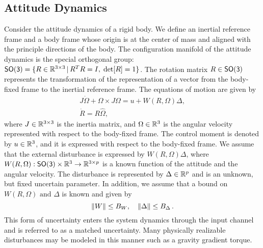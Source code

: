 \documentclass[letterpaper, 10 pt, conference]{ieeeconf}  %
\begin{document}
\subsection{Attitude Dynamics}\label{sec:att_dyn}
Consider the attitude dynamics of a rigid body. 
We define an inertial reference frame and a body frame whose origin is at the center of mass and aligned with the principle directions of the body. 
The configuration manifold of the attitude dynamics is the special orthogonal group: \(\mathsf{SO(3)} = \{R\in\mathbb{R}^{3\times 3}\,|\, R^TR=I,\;\mathrm{det}[R]=1\} \).
The rotation matrix $R\in\mathsf{SO(3)}$ represents the transformation of the representation of a vector from the body-fixed frame to the inertial reference frame. 
The equations of motion are given by
\begin{gather}
	J\dot\Omega + \Omega\times J\Omega = u+W(R,\Omega)\Delta ,\label{eqn:Wdot}\\
	\dot R = R\hat\Omega ,\label{eqn:Rdot}
\end{gather}
where $J\in\mathbb{R}^{3\times 3}$ is the inertia matrix, and $\Omega\in\mathbb{R}^{3}$ is the angular velocity represented with respect to the body-fixed frame. 
The control moment is denoted by $u\in\mathbb{R}^{3}$, and it is expressed with respect to the body-fixed frame. 
We assume that the external disturbance is expressed by $W(R,\Omega)\Delta$, where $W(R,\Omega):\mathsf{SO(3)}\times\mathbb{R}^{3}\rightarrow \mathbb{R}^{3\times p}$ is a known function of the attitude and the angular velocity.
The disturbance is represented by $\Delta\in\mathbb{R}^{p}$ and is an unknown, but fixed uncertain parameter.
In addition, we assume that a bound on \( W(R, \Omega) \text{ and } \Delta \) is known and given by
\begin{equation}
	\left\| W \right\| \leq B_W , \quad \left\| \Delta \right\| \leq B_\Delta \,. \label{eqn:W_bound}
\end{equation}
This form of uncertainty enters the system dynamics through the input channel and is referred to as a matched uncertainty. 
Many physically realizable disturbances may be modeled in this manner such as a gravity gradient torque.
\end{document}

